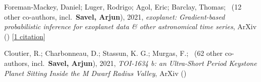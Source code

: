 \item[{\color{numcolor}\scriptsize2}] Foreman-Mackey, Daniel; Luger, Rodrigo; Agol, Eric; Barclay, Thomas; \etal\ ({12} other co-authors, incl.\ \textbf{Savel, Arjun}), 2021, \emph{exoplanet: Gradient-based probabilistic inference for exoplanet data \& other astronomical time series}, ArXiv () [\href{https://ui.adsabs.harvard.edu/abs/2021arXiv210501994F}{1 citation}]

\item[{\color{numcolor}\scriptsize1}] Cloutier, R.; Charbonneau, D.; Stassun, K. G.; Murgas, F.; \etal\ ({62} other co-authors, incl.\ \textbf{Savel, Arjun}), 2021, \emph{TOI-1634 b: an Ultra-Short Period Keystone Planet Sitting Inside the M Dwarf Radius Valley}, ArXiv ()